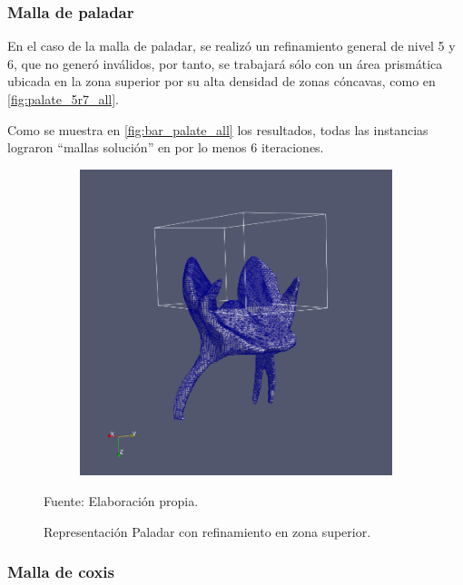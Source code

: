 \subsubsection{Malla de paladar}

En el caso de la malla de paladar, se realizó un refinamiento general de nivel 5 y 6, que no generó \elements{} inválidos, por tanto, se trabajará sólo con un área prismática ubicada en la zona superior por su alta densidad de zonas cóncavas, como en \autoref{fig:palate_5r7_all}. 

Como se muestra en \autoref{fig:bar_palate_all} los resultados, todas las instancias lograron ``mallas solución'' en por lo menos 6 iteraciones.

\begin{figure}[!ht]
    \centering
    \begin{subfigure}[t]{0.8\textwidth}
        \includegraphics[width=1.0\textwidth]{figures/meshes/palate_5r7_01.png}
    \end{subfigure}
    \caption{ Representación Paladar con refinamiento en zona superior. }
    Fuente: Elaboración propia.
    \label{fig:palate_5r7_all}
\end{figure}

\subsubsection{Malla de coxis}

